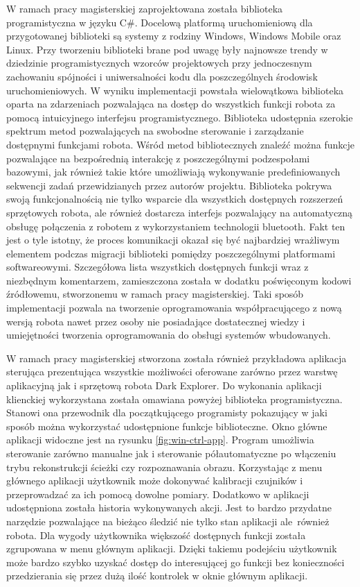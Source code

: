 W ramach pracy magisterskiej zaprojektowana została biblioteka programistyczna w
języku C\#. Docelową platformą uruchomieniową dla przygotowanej biblioteki są
systemy z rodziny Windows, Windows Mobile oraz Linux. Przy tworzeniu biblioteki
brane pod uwagę były najnowsze trendy w dziedzinie programistycznych wzorców
projektowych przy jednoczesnym zachowaniu spójności i uniwersalności kodu dla
poszczególnych środowisk uruchomieniowych. W wyniku implementacji powstała
wielowątkowa biblioteka oparta na zdarzeniach pozwalająca na dostęp do wszystkich
funkcji robota za pomocą intuicyjnego interfejsu programistycznego. Biblioteka
udostępnia szerokie spektrum metod pozwalających na swobodne sterowanie i
zarządzanie dostępnymi funkcjami robota. Wśród metod bibliotecznych znaleźć można
funkcje pozwalające na bezpośrednią interakcję z poszczególnymi podzespołami
bazowymi, jak również takie które umożliwiają wykonywanie predefiniowanych
sekwencji zadań przewidzianych przez autorów projektu. Biblioteka pokrywa swoją
funkcjonalnością nie tylko wsparcie dla wszystkich dostępnych rozszerzeń
sprzętowych robota, ale również dostarcza interfejs pozwalający na automatyczną
obsługę połączenia z robotem z wykorzystaniem technologii bluetooth. Fakt ten
jest o tyle istotny, że proces komunikacji okazał się być najbardziej wrażliwym
elementem podczas migracji biblioteki pomiędzy poszczególnymi platformami
softwareowymi. Szczegółowa lista wszystkich dostępnych funkcji wraz z niezbędnym
komentarzem, zamieszczona została w dodatku poświęconym kodowi źródłowemu,
stworzonemu w ramach pracy magisterskiej. Taki sposób implementacji pozwala na
tworzenie oprogramowania współpracującego z nową wersją robota nawet przez osoby
nie posiadające dostatecznej wiedzy i umiejętności tworzenia oprogramowania do
obsługi systemów wbudowanych.

W ramach pracy magisterskiej stworzona została również przykładowa aplikacja
sterująca prezentująca wszystkie możliwości oferowane zarówno przez warstwę
aplikacyjną jak i sprzętową robota Dark Explorer. Do wykonania aplikacji
klienckiej wykorzystana została omawiana powyżej biblioteka programistyczna.
Stanowi ona przewodnik dla początkującego programisty pokazujący w jaki sposób
można wykorzystać udostępnione funkcje biblioteczne. Okno główne aplikacji
widoczne jest na rysunku \ref{fig:win-ctrl-app}. Program umożliwia
sterowanie zarówno manualne jak i sterowanie półautomatyczne
po włączeniu trybu rekonstrukcji ścieżki czy rozpoznawania obrazu. Korzystając z
menu głównego aplikacji użytkownik może dokonywać kalibracji czujników i
przeprowadzać za ich pomocą dowolne pomiary. Dodatkowo w aplikacji udostępniona
została historia wykonywanych akcji. Jest to bardzo przydatne narzędzie
pozwalające na bieżąco śledzić nie tylko stan aplikacji ale~również robota. Dla
wygody użytkownika większość dostępnych funkcji została zgrupowana w
menu głównym aplikacji. Dzięki takiemu podejściu użytkownik może bardzo szybko
uzyskać dostęp do interesującej go funkcji bez konieczności przedzierania się
przez dużą ilość kontrolek w oknie głównym aplikacji. 
\newpage

